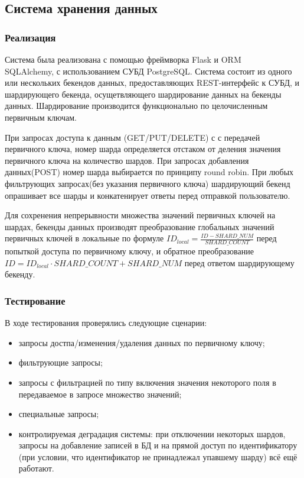 \documentclass[a4paper,12pt]{report}
\numberwithin{equation}{section}
\begin{document}
  \subsection{Система хранения данных}
  \subsubsection{Реализация}
  Система была реализована с помощью фреймворка Flask и ORM \\ SQLAlchemy, с использованием СУБД PostgreSQL.
  Система состоит из одного или нескольких бекендов данных, предоставляющих REST-интерфейс к СУБД, и шардирующего бекенда, осущетвляющего шардирование
  данных на бекенды данных. Шардирование производится функционально по целочисленным первичным ключам.
  
  
  При запросах доступа к данным (GET/PUT/DELETE) с
  с передачей первичного ключа, номер шарда определяется отстаком от деления значения первичного ключа на количество шардов. При запросах добавления данных(POST)
  номер шарда выбирается по принципу round robin. При любых фильтрующих запросах(без указания первичного ключа) шардирующий бекенд опрашивает все шарды и 
  конкатенирует ответы перед отправкой пользователю. 
  
  
  Для сохренения непрерывности множества значений первичных ключей на шардах, бекенды данных производят преобразование глобальных значений первичных ключей
  в локальные по формуле $ID_{local} = \frac{ID - SHARD\_NUM}{SHARD\_COUNT}$ перед попыткой доступа по первичному ключу, и обратное преобразование 
  $ID = ID_{local} \cdot SHARD\_COUNT + SHARD\_NUM$ перед ответом шардирующему бекенду.
  
  \subsubsection{Тестирование}
  В ходе тестирования проверялись следующие сценарии:
  
  \begin{itemize}
    \item запросы достпа/изменения/удаления данных по первичному ключу;
    \item фильтрующие запросы;
    \item запросы с фильтрацией по типу включения значения некоторого поля в передаваемое в запросе множество значений;
    \item специальные запросы;
    \item контролируемая деградация системы: при отключении некоторых шардов, запросы на добавление записей в БД и на прямой доступ по идентификатору (при условии, что идентификатор не принадлежал упавшему шарду) всё ещё работают.
  \end{itemize}
  
\end{document}
